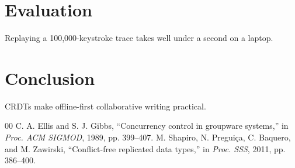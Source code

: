 \documentclass[conference]{IEEEtran}
\begin{document}
\section{Evaluation}
Replaying a 100{,}000-keystroke trace takes well under a second on a laptop.

\section{Conclusion}
CRDTs make offline-first collaborative writing practical.

\begin{thebibliography}{00}
 C. A. Ellis and S. J. Gibbs, ``Concurrency control in groupware systems,'' in \textit{Proc. ACM SIGMOD}, 1989, pp. 399--407.
 M. Shapiro, N. Pregui\c{c}a, C. Baquero, and M. Zawirski, ``Conflict-free replicated data types,'' in \textit{Proc. SSS}, 2011, pp. 386--400.
\end{thebibliography}
\end{document}
